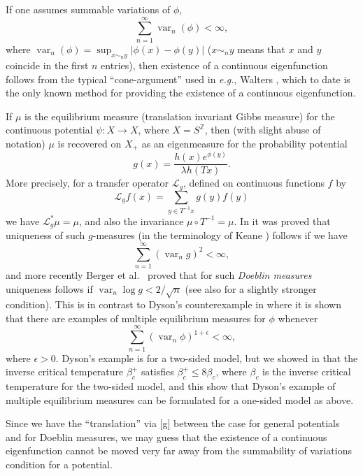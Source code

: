 \documentclass[11pt, a4paper]{amsart}
\theoremstyle{definition}
\theoremstyle{remark}
\providecommand{\opn}{\operatorname}
\providecommand{\var}{\opn{var}}
\begin{document}
If one assumes summable variations of $\phi$,
\begin{equation}\label{sum}
  \sum_{n=1}^\infty \var_n (\phi)<\infty,
\end{equation}
where $\var_n(\phi)=\sup_{x\sim_n y}|\phi(x)-\phi(y)|$ ($x\sim_n y$ means that
$x$ and $y$ coincide in the first $n$ entries), then existence of a continuous
eigenfunction follows from the typical ``cone-argument'' used in {\em e.g.},
Walters \cite{walters1}, which to date is the only
known method for providing the existence of a continuous eigenfunction.

If $\mu$ is the equilibrium measure (translation invariant Gibbs measure) for
the continuous potential $\psi:X\to X$, where $X=S^{\mathbb Z}$, then (with
slight abuse of notation) $\mu$ is recovered on $X_+$ as an eigenmeasure for the
probability potential
\begin{equation}\label{g}
  g(x)= \frac{h(x) e^{\phi(y)}}{\lambda h(Tx)}.
\end{equation} 
More precisely, for a transfer operator ${\mathcal L}_g$, defined on continuous functions $f$ by
\begin{equation} {\mathcal L}_g f(x)=\sum_{y\in T^{-1}x} g(y) f(y)
\end{equation}
we have ${\mathcal L}_g^*\mu=\mu$, and also the invariance $\mu\circ
T^{-1}=\mu$. In \cite{johob} it was proved that uniqueness of such $g$-measures (in the terminology of Keane \cite{keane}) follows if
we have
$$\sum_{n=1}^\infty (\var_n g)^2<\infty,$$
and more recently Berger et al.\  \cite{berger2} proved that for such {\em Doeblin measures} uniqueness follows if
$\var_n \log g <2/\sqrt{n}$ (see also \cite{johob3} for a slightly stronger condition). This is in contrast to Dyson's counterexample in \cite{dyson} where it is shown that there are examples of multiple equilibrium measures for $\phi$ whenever 
$$\sum_{n=1}^\infty (\var_n \phi)^{1+\epsilon}<\infty,$$
where $\epsilon>0$. Dyson's example is for a two-sided model, but we showed in \cite{johob4} that the inverse critical temperature $\beta_c^+$ satisfies $\beta_c^+\leq 8\beta_c$, where  $\beta_c$ is the inverse critical temperature for the two-sided model, and this show that Dyson's example of multiple equilibrium measures can be formulated for a one-sided model as above.

Since we have the ``translation'' via \eqref{g} between the case for general potentials and for Doeblin measures, we may guess that the existence of a continuous eigenfunction cannot be moved very far away from the summability of variations condition for a potential.
\end{document}
